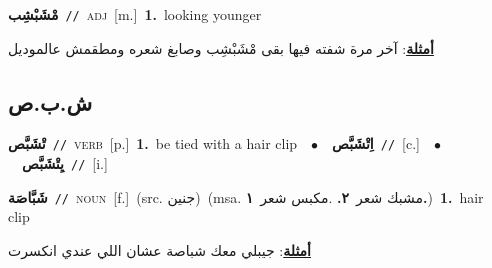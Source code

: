 \documentclass[10pt,a4paper,twoside]{article} %
\begin{document}
\begin{multicols}{2}
{\setlength\topsep{0pt}\textbf{\foreignlanguage{arabic}{مْشَبْشِب}}\ {\color{gray}\texttt{//}\color{black}}\ \textsc{adj}\ [m.]\ \textbf{1.}~looking younger\  \begin{flushright}\color{gray}\foreignlanguage{arabic}{\textbf{\underline{\foreignlanguage{arabic}{أمثلة}}}: آخر مرة شفته فيها بقى مْشَبْشِب وصابغ شعره ومطقمش عالموديل}\end{flushright}\color{black}} \vspace{2mm}

\vspace{-3mm}
\subsection*{\color{blue}\foreignlanguage{arabic}{ش.ب.ص}\color{blue}{}} 

{\setlength\topsep{0pt}\textbf{\foreignlanguage{arabic}{تْشَبَّص}}\ {\color{gray}\texttt{//}\color{black}}\ \textsc{verb}\ [p.]\ \textbf{1.}~be tied with a hair clip\ \ $\bullet$\ \ \setlength\topsep{0pt}\textbf{\foreignlanguage{arabic}{اِتْشَبَّص}}\ {\color{gray}\texttt{//}\color{black}}\ [c.]\ \ $\bullet$\ \ \setlength\topsep{0pt}\textbf{\foreignlanguage{arabic}{يِتْشَبَّص}}\ {\color{gray}\texttt{//}\color{black}}\ [i.]\ } \vspace{2mm}

{\setlength\topsep{0pt}\textbf{\foreignlanguage{arabic}{شَبَّاصَة}}\ {\color{gray}\texttt{//}\color{black}}\ \textsc{noun}\ [f.]\ (src. \color{gray}\foreignlanguage{arabic}{جنين}\color{black})\ \color{gray}(msa. \foreignlanguage{arabic}{مشبك شعر}~\foreignlanguage{arabic}{\textbf{٢.}}  .\foreignlanguage{arabic}{مكبس شعر}~\foreignlanguage{arabic}{\textbf{١.}})\color{black}\ \textbf{1.}~hair clip\  \begin{flushright}\color{gray}\foreignlanguage{arabic}{\textbf{\underline{\foreignlanguage{arabic}{أمثلة}}}: جيبلي معك شباصة عشان اللي عندي انكسرت}\end{flushright}\color{black}} \vspace{2mm}


\end{multicols}
\end{document}
